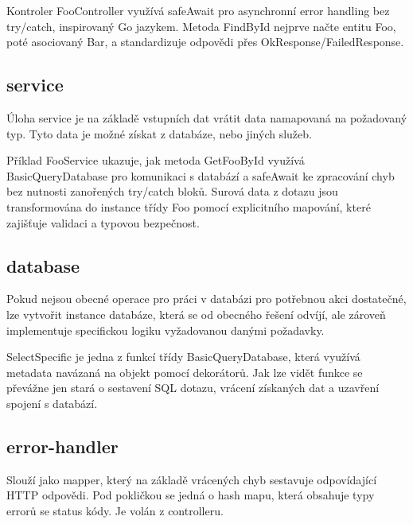 Kontroler FooController využívá safeAwait pro asynchronní error handling bez try/catch, inspirovaný Go jazykem. Metoda FindById nejprve načte entitu Foo, poté asociovaný Bar, a standardizuje odpovědi přes OkResponse/FailedResponse.

\subsection{service}
Úloha service je na základě vstupních dat vrátit data namapovaná na požadovaný typ. Tyto data je možné získat z databáze, nebo jiných služeb.



Příklad FooService ukazuje, jak metoda GetFooById využívá BasicQueryDatabase pro komunikaci s databází a safeAwait ke zpracování chyb bez nutnosti zanořených try/catch bloků. Surová data z dotazu jsou transformována do instance třídy Foo pomocí explicitního mapování, které zajišťuje validaci a typovou bezpečnost.

\subsection{database}
Pokud nejsou obecné operace pro práci v databázi pro potřebnou akci dostatečné, lze vytvořit instance databáze, která se od obecného řešení odvíjí, ale zároveň implementuje specifickou logiku vyžadovanou danými požadavky.



SelectSpecific je jedna z funkcí třídy BasicQueryDatabase, která využívá metadata navázaná na objekt pomocí dekorátorů. Jak lze vidět funkce se převážne jen stará o sestavení SQL dotazu, vrácení získaných dat a uzavření spojení s databází.

\subsection{error-handler}
Slouží jako mapper, který na základě vrácených chyb sestavuje odpovídající HTTP odpovědi. Pod pokličkou se jedná o hash mapu, která obsahuje typy errorů se status kódy. Je volán z controlleru.